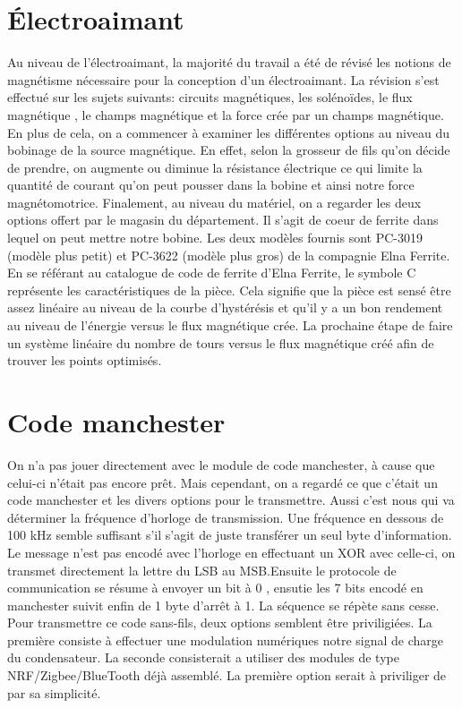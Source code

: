 \section{Électroaimant}
Au niveau de l'électroaimant, la majorité du travail a été  de révisé les notions de magnétisme nécessaire pour la conception d'un électroaimant. La révision s'est effectué sur les sujets suivants: circuits magnétiques, les solénoïdes, le flux magnétique , le champs magnétique et la force crée par un champs magnétique. En plus de cela, on a commencer à examiner les différentes options au niveau du bobinage de la source magnétique. En effet, selon la grosseur de fils qu'on décide de prendre, on augmente ou diminue la résistance électrique ce qui limite la quantité de courant qu'on peut pousser dans la bobine et ainsi notre force magnétomotrice. Finalement, au niveau du matériel, on a regarder les deux options offert par le magasin du département. Il s'agit de coeur de ferrite dans lequel on peut mettre notre bobine. Les deux modèles fournis sont PC-3019 (modèle plus petit) et PC-3622 (modèle plus gros) de la compagnie Elna Ferrite. En se référant au catalogue de code de ferrite d'Elna Ferrite, le symbole C représente les caractéristiques de la pièce. Cela signifie que la pièce est sensé être assez linéaire au niveau de la courbe d'hystérésis et qu'il y a un bon rendement au niveau de l'énergie versus le flux magnétique crée. La prochaine étape de faire un système linéaire du nombre de tours versus le flux magnétique créé afin de trouver les points optimisés.

\section{Code manchester}
On n'a pas jouer directement avec le module de code manchester, à cause que celui-ci n'était pas encore prêt. Mais cependant, on a regardé ce que c'était un code manchester et les divers options pour le transmettre. Aussi c'est nous qui va déterminer la fréquence d'horloge de transmission. Une fréquence en dessous de 100 kHz semble suffisant s'il s'agit de juste transférer un seul byte d'information. Le message n'est pas encodé avec l'horloge en effectuant un XOR avec celle-ci, on transmet directement la lettre du LSB au MSB.Ensuite le protocole de communication se résume à envoyer un bit à 0 , ensutie les 7 bits encodé en manchester suivit enfin de 1 byte d'arrêt à 1. La séquence se répète sans cesse. Pour transmettre ce code sans-fils, deux options semblent être priviligiées. La première consiste à effectuer une modulation numériques notre signal de charge du condensateur. La seconde consisterait a utiliser des modules de type NRF/Zigbee/BlueTooth déjà assemblé. La première option serait à priviliger de par sa simplicité.


